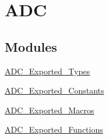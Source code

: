 \hypertarget{group__ADC}{
\section{ADC}
\label{group__ADC}
}
\subsection*{Modules}
\begin{DoxyCompactItemize}
\item 
\hyperlink{group__ADC__Exported__Types}{ADC\_\-Exported\_\-Types}
\item 
\hyperlink{group__ADC__Exported__Constants}{ADC\_\-Exported\_\-Constants}
\item 
\hyperlink{group__ADC__Exported__Macros}{ADC\_\-Exported\_\-Macros}
\item 
\hyperlink{group__ADC__Exported__Functions}{ADC\_\-Exported\_\-Functions}
\end{DoxyCompactItemize}
